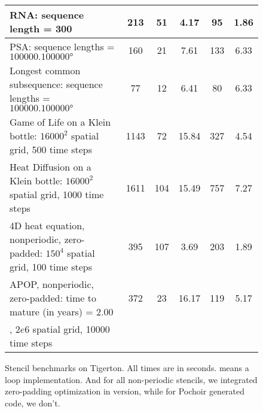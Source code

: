 \begin{figure*}
\begin{tabular}{|m{7cm}|c|c|c|c|c|}
RNA: sequence length = 300                                                              & 213 & 51 & 4.17 & 95 & 1.86 \\\hline
PSA: sequence lengths = $\ang{100000, 100000}$                                          & 160 & 21 & 7.61 & 133 & 6.33 \\\hline
Longest common subsequence: sequence lengths = $\ang{100000, 100000}$ 	                & 77 & 12 & 6.41 & 80 & 6.33 \\\hline
Game of Life on a Klein bottle: $16000^2$ spatial grid, 500 time steps                  & 1143 & 72 & 15.84 & 327 & 4.54 \\\hline
Heat Diffusion on a Klein bottle: $16000^2$ spatial grid, 1000 time steps               & 1611 & 104 & 15.49 & 757 &  7.27 \\\hline
4D heat equation, nonperiodic, zero-padded: $150^4$ spatial grid, 100 time steps        & 395 & 107 & 3.69 & 203 & 1.89 \\\hline
APOP, nonperiodic, zero-padded: time to mature (in years) = 2.00        & 372 & 23 & 16.17 & 119 & 5.17 \\
, $2e6$ spatial grid, 10000 time steps & & & & & \\\hline

\end{tabular}
\caption{Stencil benchmarks on Tigerton.  All times are in seconds.  means a  loop implementation. And for all non-periodic stencils, we integrated zero-padding optimization in  version, while for Pochoir generated code, we don't. }
\label{fig:results:cagnode17}
\end{figure*}



